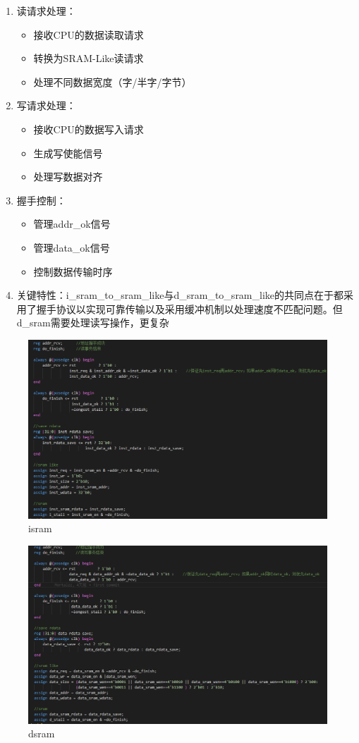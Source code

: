 \begin{enumerate}
\item 读请求处理：
\begin{itemize}
	\item 接收CPU的数据读取请求
	\item 转换为SRAM-Like读请求
	\item 处理不同数据宽度（字/半字/字节）
\end{itemize}
\item 写请求处理：
\begin{itemize}
	\item 接收CPU的数据写入请求
	\item 生成写使能信号
	\item 处理写数据对齐
\end{itemize}
\item 握手控制：
\begin{itemize}
	\item 管理addr\_ok信号
	\item 管理data\_ok信号
	\item 控制数据传输时序
\end{itemize}
\item 关键特性：i\_sram\_to\_sram\_like与d\_sram\_to\_sram\_like的共同点在于都采用了握手协议以实现可靠传输以及采用缓冲机制以处理速度不匹配问题。但d\_sram需要处理读写操作，更复杂
\end{enumerate}
\begin{figure}
\centering
\includegraphics[width=0.5\linewidth]{image/P11.png}
\caption{isram}
\label{fig:enter-label}
\end{figure}
\begin{figure}
\centering
\includegraphics[width=0.5\linewidth]{image/P12.png}
\caption{dsram}
\label{fig:enter-label}
\end{figure}


